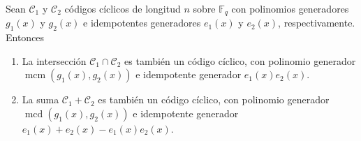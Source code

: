 \begin{theorem}
  \label{th:intersecciones-sumas-ciclicos}
  Sean \(\mathcal C_1\) y \(\mathcal C_2\) códigos cíclicos de longitud \(n\) sobre \(\mathbb F_q\) con polinomios generadores \(g_1(x)\) y \(g_2(x)\) e idempotentes generadores \(e_1(x)\) y \(e_2(x)\), respectivamente.
  Entonces \begin{enumerate}
    \item La intersección \(\mathcal C_1 \cap \mathcal C_2\) es también un código cíclico, con polinomio generador \(\operatorname{mcm}(g_1(x), g_2(x))\) e idempotente generador \(e_1(x)e_2(x)\).
    \item La suma \(\mathcal C_1 + \mathcal C_2\) es también un código cíclico, con polinomio generador \(\operatorname{mcd}(g_1(x), g_2(x))\) e idempotente generador \(e_1(x) + e_2(x) - e_1(x)e_2(x)\).
    \label{th:intersecciones-sumas-ciclicos:sumas}
  \end{enumerate}
\end{theorem}


